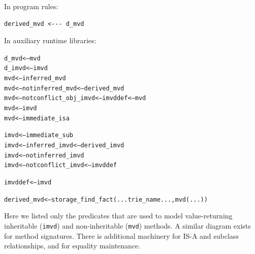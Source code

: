 \documentclass[11pt]{article}
\newcommand{\TNOT}{{{\tt not}}\xspace}
\begin{document}
\noindent
In program rules:
\begin{verbatim}
derived_mvd <--- d_mvd  
\end{verbatim}
\noindent
In auxiliary runtime libraries:
\begin{alltt}
d_mvd  <---  mvd
d_imvd <--- imvd
          mvd <---      inferred_mvd
          mvd <--- \TNOT inferred_mvd      <--- derived_mvd
          mvd <--- \TNOT conflict_obj_imvd                     <--- imvddef <--- mvd
          mvd <---      imvd
          mvd <---      immediate_isa

         imvd <---      immediate_sub
         imvd <---      inferred_imvd     <--- derived_imvd
         imvd <--- \TNOT inferred_imvd
         imvd <--- \TNOT conflict_imvd                         <--- imvddef

      imvddef <---      imvd

  derived_mvd <--- storage_find_fact(...trie_name..., mvd(...))
\end{alltt}
Here we listed only the predicates that are used to model value-returning
inheritable ({\tt imvd}) and non-inheritable ({\tt mvd}) methods.  A similar
diagram exists for
method signatures. There is additional machinery for
IS-A and subclass relationships, and for equality maintenance.
\end{document}
